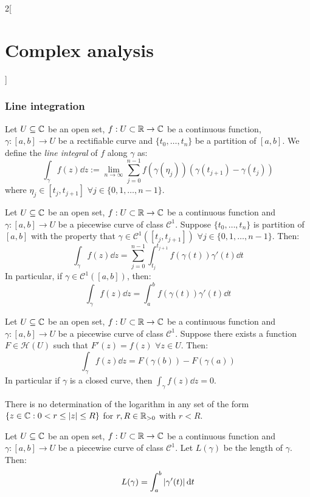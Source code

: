 \documentclass[../../../main_math.tex]{subfiles}
\begin{document}
\begin{multicols}{2}[\section{Complex analysis}]
  \subsubsection{Line integration}
  \begin{definition}
    Let $U\subseteq \mathbb{C}$ be an open set, $f:U\subset\mathbb{R}\rightarrow\mathbb{C}$ be a continuous function, $\gamma:[a,b]\rightarrow U$ be a rectifiable curve and $\{t_0,\ldots,t_n\}$ be a partition of $[a,b]$. We define the \emph{line integral} of $f$ along $\gamma$ as: $$\int_\gamma f(z)\dd{z}:=\lim_{n\to\infty}\sum_{j=0}^{n-1}f(\gamma(\eta_j))(\gamma(t_{j+1})-\gamma(t_j))$$ where $\eta_j\in[t_j,t_{j+1}]$ $\forall j\in\{0,1,\ldots,n-1\}$.
  \end{definition}
  \begin{definition}
    Let $U\subseteq \mathbb{C}$ be an open set, $f:U\subset\mathbb{R}\rightarrow\mathbb{C}$ be a continuous function and $\gamma:[a,b]\rightarrow U$ be a piecewise curve of class $\mathcal{C}^1$. Suppose $\{t_0,\ldots,t_n\}$ is partition of $[a,b]$ with the property that $\gamma\in\mathcal{C}^1([t_j,t_{j+1}])$ $\forall j\in\{0,1,\ldots,n-1\}$. Then: $$\int_\gamma f(z)\dd{z}=\sum_{j=0}^{n-1}\int_{t_j}^{t_{j+1}}f(\gamma(t))\gamma'(t)\dd{t}$$
    In particular, if $\gamma\in\mathcal{C}^1([a,b])$, then: $$\int_\gamma f(z)\dd{z}=\int_a^bf(\gamma(t))\gamma'(t)\dd{t}$$
  \end{definition}
  \begin{theorem}
    Let $U\subseteq \mathbb{C}$ be an open set, $f:U\subset\mathbb{R}\rightarrow\mathbb{C}$ be a continuous function and $\gamma:[a,b]\rightarrow U$ be a piecewise curve of class $\mathcal{C}^1$. Suppose there exists a function $F\in\mathcal{H}(U)$ such that $F'(z)=f(z)$ $\forall z\in U$. Then:
    $$\int_\gamma f(z)\dd{z}=F(\gamma(b))-F(\gamma(a))$$ In particular if $\gamma$ is a closed curve, then $\int_\gamma f(z)\dd{z}=0$.
  \end{theorem}
  \begin{corollary}
    There is no determination of the logarithm in any set of the form $\{z\in\mathbb{C}:0<r\leq\abs{z}\leq R\}$ for $r,R\in\mathbb{R}_{> 0}$ with $r<R$.
  \end{corollary}
  \begin{proposition}
    Let $U\subseteq \mathbb{C}$ be an open set, $f:U\subset\mathbb{R}\rightarrow\mathbb{C}$ be a continuous function and $\gamma:[a,b]\rightarrow U$ be a piecewise curve of class $\mathcal{C}^1$. Let $L(\gamma)$ be the length of $\gamma$. Then: $$L(\gamma)=\int_a^b\abs{\gamma'(t)}\dd{t}$$
  \end{proposition}
  \begin{proposition}

\end{proposition}
\end{multicols}
\end{document}
